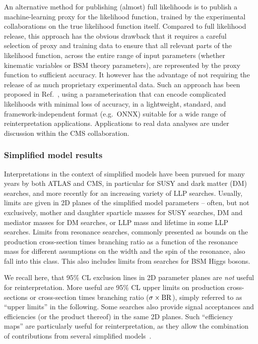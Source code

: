 \documentclass[a4paper,aps,prd,longbibliography,notitlepage,showpacs,amsmath,amssymb,superscriptaddress,nofootinbib,floatfix,11pt,preprintnumbers]{revtex4-1-mod}
\newcommand{\eg}{e.g.\xspace}
\renewcommand{\emph}[1]{\textit{#1}}
\begin{document}
An alternative method for publishing (almost) full likelihoods is to publish a machine-learning proxy for the likelihood function, trained by the experimental collaborations on the true likelihood function itself.  Compared to full likelihood release, this approach has the obvious drawback that it requires a careful selection of proxy and training data to ensure that all relevant parts of the likelihood function, across the entire range of input parameters (whether kinematic variables or BSM theory parameters), are represented by the proxy function to sufficient accuracy. It however has the advantage of not requiring the release of as much proprietary experimental data. Such an approach has been proposed in Ref.~\cite{Coccaro:2019lgs}, using a parameterisation that can encode complicated likelihoods with minimal loss of accuracy, in a lightweight, standard, and framework-independent format (\eg~\textsf{ONNX}) suitable for a wide range of reinterpretation applications. Applications to real data analyses are under discussion within the CMS collaboration.


\subsubsection{Simplified model results}

Interpretations in the context of simplified models
have been pursued for many years by both ATLAS and CMS,
in particular for SUSY and dark matter (DM) searches, and more recently for an increasing variety of LLP searches.
Usually, limits are given in 2D planes of the simplified model parameters -- often, but not exclusively, mother and daughter sparticle masses for SUSY searches, DM and mediator masses for DM searches, or LLP mass and lifetime in some LLP searches. Limits from resonance searches, commonly presented as bounds on the production cross-section times branching ratio as a function of the resonance mass for different assumptions on the width and the spin of the resonance, also fall into this class. This also includes limits from searches for BSM Higgs bosons.

We recall here, that 95\% CL exclusion lines in 2D parameter planes are \emph{not} useful for reinterpretation.
More useful are 95\% CL upper limits on production cross-sections or cross-section times branching ratio ($\sigma \times {\rm BR}$), simply referred to as ``upper limits'' in the following.
Some searches also provide signal acceptances and efficiencies (or the product thereof) in the same 2D planes. Such ``efficiency maps'' are particularly useful for reinterpretation, as they allow the combination of contributions from several simplified  models~\cite{Papucci:2014rja,Ambrogi:2017neo}.
\end{document}
